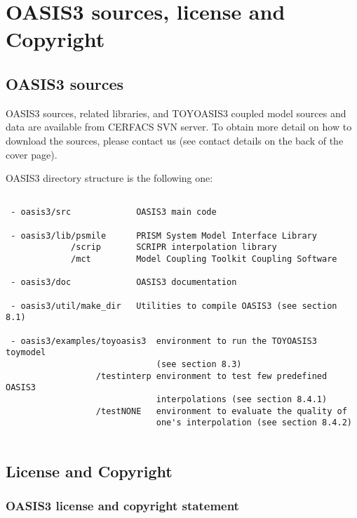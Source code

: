 \newpage
\chapter{OASIS3 sources, license and Copyright}
\label{sec_Obtaining}
%
\section{OASIS3 sources}
OASIS3 sources, related libraries, and TOYOASIS3
coupled model sources and data are available from CERFACS SVN server. To obtain more detail on how to download
the sources, please
contact us (see contact details on the back of the cover page).

OASIS3 directory structure is the following one:

\begin{verbatim}

 - oasis3/src             OASIS3 main code
 
 - oasis3/lib/psmile      PRISM System Model Interface Library
             /scrip       SCRIPR interpolation library
             /mct         Model Coupling Toolkit Coupling Software
                  
 - oasis3/doc             OASIS3 documentation
 
 - oasis3/util/make_dir   Utilities to compile OASIS3 (see section 8.1) 

 - oasis3/examples/toyoasis3  environment to run the TOYOASIS3 toymodel
                              (see section 8.3)
                  /testinterp environment to test few predefined OASIS3
                              interpolations (see section 8.4.1)
                  /testNONE   environment to evaluate the quality of 
                              one's interpolation (see section 8.4.2)    
 
\end{verbatim}
%                              
% 
%

\section{License and Copyright}

\subsection{OASIS3 license and copyright statement}

